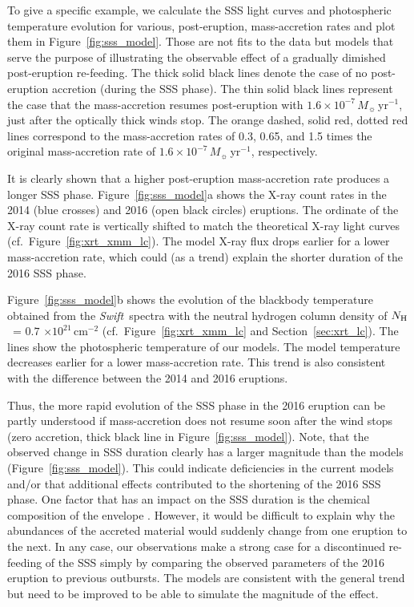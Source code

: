 \documentclass[twocolumn,tighten]{aastex6}
\def\swift{{\it Swift~}}
\newcommand{\nh}{\hbox{$N_{\rm H}$}~}
\newcommand{\hcm}[1]{$\times 10^{#1}$\,cm$^{-2}$}
\begin{document}
To give a specific example, we calculate the SSS light curves and photospheric temperature evolution for various, post-eruption, mass-accretion rates and plot them in Figure~\ref{fig:sss_model}. Those are not fits to the data but models that serve the purpose of illustrating the observable effect of a gradually dimished post-eruption re-feeding. The thick solid black lines denote the case of no post-eruption accretion (during the SSS phase). The thin solid black lines represent the case that the mass-accretion resumes post-eruption with $1.6\times 10^{-7}\,M_\sun$\,yr$^{-1}$, just after the optically thick winds stop. The orange dashed, solid red, dotted red lines correspond to the mass-accretion rates of 0.3, 0.65, and 1.5 times the original mass-accretion rate of $1.6\times 10^{-7}\,M_\sun$\,yr$^{-1}$, respectively.

It is clearly shown that a higher post-eruption mass-accretion rate produces a longer SSS phase. Figure~\ref{fig:sss_model}a shows the X-ray count rates in the 2014 (blue crosses) and 2016 (open black circles) eruptions. The ordinate of the X-ray count rate is vertically shifted to match the theoretical X-ray light curves (cf.\ Figure~\ref{fig:xrt_xmm_lc}). The model X-ray flux drops earlier for a lower mass-accretion rate, which could (as a trend) explain the shorter duration of the 2016 SSS phase. 

Figure~\ref{fig:sss_model}b shows the evolution of the blackbody temperature obtained from the \swift spectra with the neutral hydrogen column density of \nh = $0.7$ \hcm{21} (cf.\ Figure~\ref{fig:xrt_xmm_lc} and Section~\ref{sec:xrt_lc}). The lines show the photospheric temperature of our models. The model temperature decreases earlier for a lower mass-accretion rate. This trend is also consistent with the difference between the 2014 and 2016 eruptions. 

Thus, the more rapid evolution of the SSS phase in the 2016 eruption can be partly understood if mass-accretion does not resume soon after the wind stops (zero accretion, thick black line in Figure~\ref{fig:sss_model}). Note, that the observed change in SSS duration clearly has a larger magnitude than the models (Figure~\ref{fig:sss_model}). This could indicate deficiencies in the current models and/or that additional effects contributed to the shortening of the 2016 SSS phase. One factor that has an impact on the SSS duration is the chemical composition of the envelope \citep[e.g.,][]{2005A&A...439.1061S}. However, it would be difficult to explain why the abundances of the accreted material would suddenly change from one eruption to the next. In any case, our observations make a strong case for a discontinued re-feeding of the SSS simply by comparing the observed parameters of the 2016 eruption to previous outbursts. The models are consistent with the general trend but need to be improved to be able to simulate the magnitude of the effect.
\end{document}
